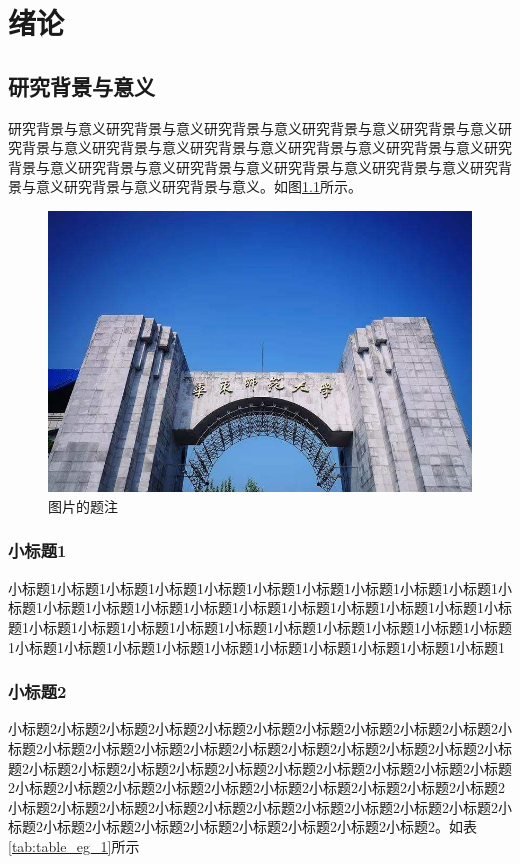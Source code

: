 \chapter{绪论}
\label{ch1}
\section{研究背景与意义}
研究背景与意义研究背景与意义研究背景与意义研究背景与意义研究背景与意义研究背景与意义研究背景与意义研究背景与意义研究背景与意义研究背景与意义研究背景与意义研究背景与意义研究背景与意义研究背景与意义研究背景与意义研究背景与意义研究背景与意义研究背景与意义\cite{ReferenceName}。如图\ref{fig:traditional_framework}所示。

\begin{figure}[H]\vspace{0pt}
	\centering
	\includegraphics[width=0.95\linewidth]{fig/timg}
	\caption{图片的题注}
	\label{fig:traditional_framework}\vspace{0pt}
\end{figure}

\subsection{小标题1}
小标题1小标题1小标题1小标题1小标题1小标题1小标题1小标题1小标题1小标题1小标题1小标题1小标题1小标题1小标题1小标题1小标题1小标题1小标题1小标题1小标题1小标题1小标题1小标题1小标题1小标题1小标题1小标题1小标题1小标题1小标题1小标题1小标题1小标题1小标题1小标题1小标题1小标题1小标题1小标题1小标题1

\subsection{小标题2}
小标题2小标题2小标题2小标题2小标题2小标题2小标题2小标题2小标题2小标题2小标题2小标题2小标题2小标题2小标题2小标题2小标题2小标题2小标题2小标题2小标题2小标题2小标题2小标题2小标题2小标题2小标题2小标题2小标题2小标题2小标题2小标题2小标题2小标题2小标题2小标题2小标题2小标题2小标题2小标题2小标题2小标题2小标题2小标题2小标题2小标题2小标题2小标题2小标题2小标题2小标题2小标题2小标题2小标题2小标题2小标题2小标题2小标题2小标题2小标题2。如表\ref{tab:table_eg_1}所示

